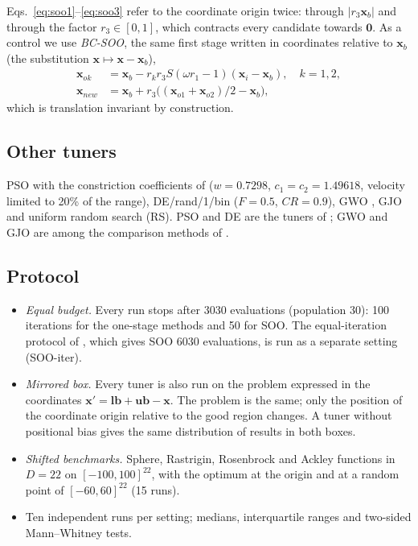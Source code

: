 \documentclass[review,12pt]{elsarticle}
\begin{document}
Eqs.~\eqref{eq:soo1}--\eqref{eq:soo3} refer to the coordinate origin twice: through $|r_3\boldsymbol{x}_b|$ and
through the factor $r_3\in[0,1]$, which contracts every candidate towards $\boldsymbol{0}$. As a control we use
\emph{BC-SOO}, the same first stage written in coordinates relative to $\boldsymbol{x}_b$ (the substitution
$\boldsymbol{x}\mapsto\boldsymbol{x}-\boldsymbol{x}_b$),
\begin{equation}
\begin{aligned}
  \boldsymbol{x}_{ok} &= \boldsymbol{x}_b - r_k r_3 S(\omega r_1-1)(\boldsymbol{x}_i-\boldsymbol{x}_b),\quad k=1,2,\\
  \boldsymbol{x}_{new} &= \boldsymbol{x}_b + r_3\big((\boldsymbol{x}_{o1}+\boldsymbol{x}_{o2})/2-\boldsymbol{x}_b\big),
\end{aligned}
\end{equation}
which is translation invariant by construction.

\subsection{Other tuners}
PSO with the constriction coefficients of \cite{clerc2002} ($w=0.7298$, $c_1=c_2=1.49618$, velocity limited to
20\% of the range), DE/rand/1/bin \cite{storn1997de} ($F=0.5$, $CR=0.9$), GWO \cite{mirjalili2014gwo}, GJO
\cite{chopra2022gjo} and uniform random search (RS). PSO and DE are the tuners of \cite{ersoy2026jestech};
GWO and GJO are among the comparison methods of \cite{nour2026scirep}.

\subsection{Protocol}
\begin{itemize}
\item \emph{Equal budget.} Every run stops after 3030 evaluations (population 30): 100 iterations for the
  one-stage methods and 50 for SOO. The equal-iteration protocol of \cite{nour2026scirep}, which gives SOO
  6030 evaluations, is run as a separate setting (SOO-iter).
\item \emph{Mirrored box.} Every tuner is also run on the problem expressed in the coordinates
  $\boldsymbol{x}'=\boldsymbol{lb}+\boldsymbol{ub}-\boldsymbol{x}$. The problem is the same; only the position of
  the coordinate origin relative to the good region changes. A tuner without positional bias gives the same
  distribution of results in both boxes.
\item \emph{Shifted benchmarks.} Sphere, Rastrigin, Rosenbrock and Ackley functions in $D=22$ on
  $[-100,100]^{22}$, with the optimum at the origin and at a random point of $[-60,60]^{22}$ (15 runs).
\item Ten independent runs per setting; medians, interquartile ranges and two-sided Mann--Whitney tests.
\end{itemize}
\end{document}
